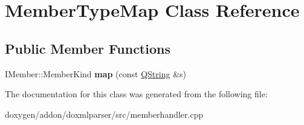 \hypertarget{class_member_type_map}{}\section{Member\+Type\+Map Class Reference}
\label{class_member_type_map}
\subsection*{Public Member Functions}
\begin{DoxyCompactItemize}
\item 
\mbox{\label{class_member_type_map_a9540600b8d426414eb3f416a5b98153f}} 
I\+Member\+::\+Member\+Kind {\bfseries map} (const \mbox{\hyperlink{class_q_string}{Q\+String}} \&s)
\end{DoxyCompactItemize}


The documentation for this class was generated from the following file\+:\begin{DoxyCompactItemize}
\item 
doxygen/addon/doxmlparser/src/memberhandler.\+cpp\end{DoxyCompactItemize}
